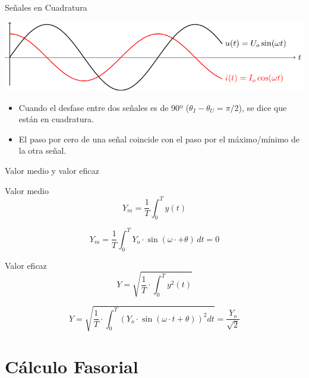 \documentclass[xcolor={usenames,svgnames,dvipsnames}]{beamer}
\begin{document}
\begin{frame}[label={sec:orgcc9cfd8}]{Señales en Cuadratura}
\begin{center}
\includegraphics[width=.9\linewidth]{figs/cuadratura.pdf}
\end{center}

\begin{itemize}
\item Cuando el desfase entre dos señales es de 90º (\(\theta_I - \theta_U = \pi/2\)), se dice que están en cuadratura.
\item El paso por cero de una señal coincide con el paso por el máximo/mínimo de la otra señal.
\end{itemize}
\end{frame}


\begin{frame}[label={sec:orge87b0bd}]{Valor medio y valor eficaz}
\begin{block}{Valor medio}
\[
Y_m=\frac{1}{T}\int_{0}^{T}y(t)
\]

\[
Y_m=\frac{1}{T}\int_{0}^{T}Y_{o}\cdot\sin(\omega\cdot+\theta)\, dt=0
\]
\end{block}
\begin{block}{Valor eficaz}
\[
Y = \sqrt{\frac{1}{T}\cdot\int_{0}^{T}y^{2}(t)}
\]

\[
Y=\sqrt{\frac{1}{T}\cdot\int_{0}^{T}\left(Y_{o}\cdot\sin(\omega\cdot t+\theta)\right)^{2}dt}=\boxed{\frac{Y_{o}}{\sqrt{2}}}
\]
\end{block}
\end{frame}
\section{Cálculo Fasorial}
\label{sec:orgac81eaf}
\end{document}

